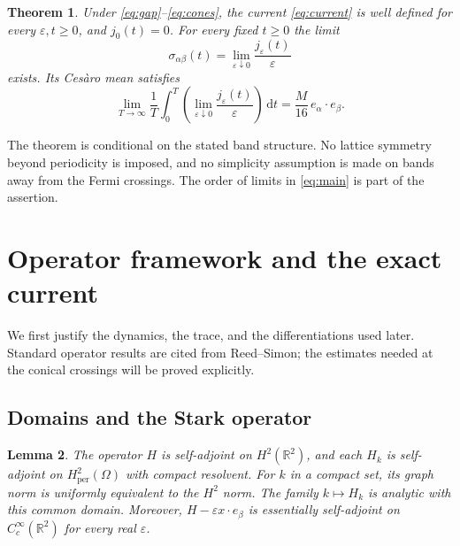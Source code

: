 \documentclass[11pt,a4paper]{article}
\numberwithin{equation}{section}
\newcommand{\R}{\mathbb R}
\newcommand{\dd}{\,\mathrm d}
\newtheorem{theorem}{Theorem}[section]
\newtheorem{lemma}[theorem]{Lemma}
\theoremstyle{remark}
\begin{document}
\begin{theorem}\label{thm:main}
Under \eqref{eq:gap}--\eqref{eq:cones}, the current
\eqref{eq:current} is well defined for every $\varepsilon,t\geq0$,
and $j_0(t)=0$. For every fixed $t\geq0$ the limit
\[
 \sigma_{\alpha\beta}(t)
   =\lim_{\varepsilon\downarrow0}\frac{j_\varepsilon(t)}{\varepsilon}
\]
exists. Its Ces\`aro mean satisfies
\begin{equation}\label{eq:main}
 \lim_{T\to\infty}\frac1T\int_0^T
   \left(\lim_{\varepsilon\downarrow0}
           \frac{j_\varepsilon(t)}{\varepsilon}\right)\dd t
       =\frac{M}{16}\,e_\alpha\cdot e_\beta.
\end{equation}
\end{theorem}

The theorem is conditional on the stated band structure. No lattice
symmetry beyond periodicity is imposed, and no simplicity assumption is
made on bands away from the Fermi crossings. The order of limits in
\eqref{eq:main} is part of the assertion.

\section{Operator framework and the exact current}

We first justify the dynamics, the trace, and the differentiations used
later. Standard operator results are cited from Reed--Simon; the estimates
needed at the conical crossings will be proved explicitly.

\subsection{Domains and the Stark operator}

\begin{lemma}\label{lem:domains}
The operator $H$ is self-adjoint on $H^2(\R^2)$, and each $H_k$ is
self-adjoint on $H^2_{\mathrm{per}}(\Omega)$ with compact resolvent.
For $k$ in a compact set, its graph norm is uniformly equivalent to the
$H^2$ norm. The family $k\mapsto H_k$ is analytic with this common domain.
Moreover, $H-\varepsilon x\cdot e_\beta$ is essentially self-adjoint on
$C_c^\infty(\R^2)$ for every real $\varepsilon$.
\end{lemma}
\end{document}
